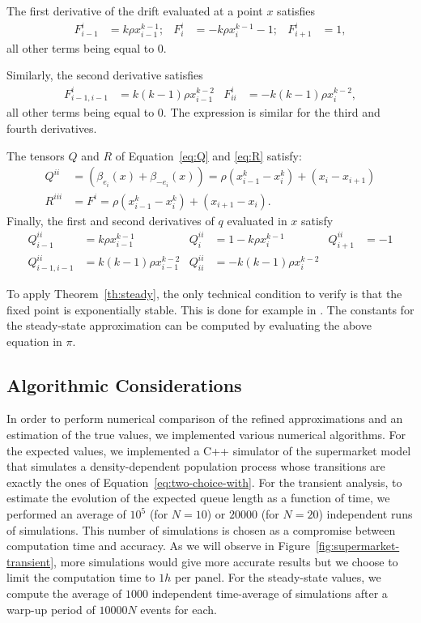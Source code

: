 \documentclass[sigconf]{acmart}
\begin{document}
The first derivative of the drift evaluated at a point $x$ satisfies
\begin{align*}
  F^i_{i-1} &= k\rho x_{i-1}^{k-1};&
  F^i_i &= -k\rho x_{i}^{k-1}-1;&  F^i_{i+1} &= 1,
\end{align*}
all other terms being equal to $0$.

Similarly, the second derivative satisfies
\begin{align*}
  F^i_{i-1,i-1} &= k(k-1)\rho x_{i-1}^{k-2}
  &F^i_{ii} &= -k(k-1)\rho x_{i}^{k-2},
\end{align*}
all other terms being equal to $0$. The expression is similar for the
third and fourth derivatives.

The tensors $Q$ and $R$ of Equation~\eqref{eq:Q} and \eqref{eq:R}
satisfy:
\begin{align*}
  Q^{ii} &= (\beta_{e_i}(x)+\beta_{-e_i}(x)) = 
           \rho(x_{i-1}^k - x_i^k)+(x_i-x_{i+1})\\
  R^{iii} &= F^i = \rho(x_{i-1}^k-x_i^k) + (x_{i+1}-x_{i}).
\end{align*}
Finally, the first and second derivatives of $q$ evaluated in $x$
satisfy
\begin{align*}
  Q^{ii}_{i-1} &= k\rho x_{i-1}^{k-1}&
  Q^{ii}_{i} &= 1-k\rho x_{i}^{k-1} &
  Q^{ii}_{i+1} &= -1\\
  Q^{ii}_{i-1,i-1} &= k(k-1)\rho x_{i-1}^{k-2}&
  Q^{ii}_{ii} &= -k(k-1)\rho x_i^{k-2}
\end{align*}


To apply Theorem~\ref{th:steady}, the only technical condition to
verify is that the fixed point is exponentially stable. This is done
for example in \cite{ying2016rate,ying2016twochoice}. The constants
for the steady-state approximation can be computed by evaluating the
above equation in $\pi$.

\subsection{Algorithmic Considerations}
\label{sec:supermarket_algo}

In order to perform numerical comparison of the refined approximations
and an estimation of the true values, we implemented various numerical
algorithms. For the expected values, we implemented a C++ simulator of
the supermarket model that simulates a density-dependent population
process whose transitions are exactly the ones of
Equation~\eqref{eq:two-choice-with}. For the transient analysis, to
estimate the evolution of the expected queue length as a function of
time, we performed an average of $10^5$ (for $N=10$) or $20000$ (for
$N=20$) independent runs of simulations. This number of simulations is
chosen as a compromise between computation time and accuracy. As we
will observe in Figure~\ref{fig:supermarket-transient}, more
simulations would give more accurate results but we choose to limit
the computation time to $1h$ per panel. For the steady-state values,
we compute the average of $1000$ independent time-average of
simulations after a warp-up period of $10000N$ events for each.
\end{document}
